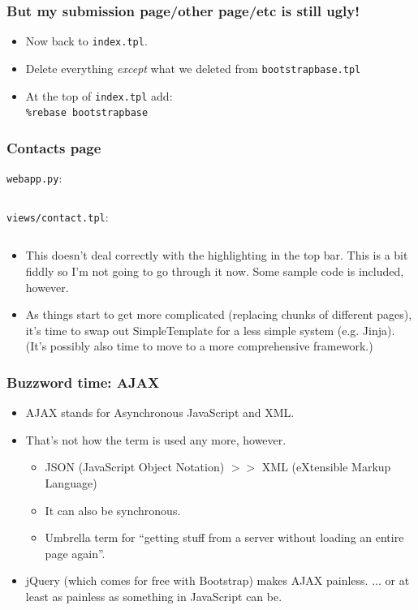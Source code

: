 \documentclass{beamer}
\begin{document}
\begin{frame}
  \frametitle{But my submission page/other page/etc is still ugly!}
  \begin{itemize}
  \item Now back to \texttt{index.tpl}.
  \item Delete everything \emph{except} what we deleted from
    \texttt{bootstrapbase.tpl}
  \item At the top of \texttt{index.tpl} add:\\
    \texttt{\%rebase bootstrapbase}
  \end{itemize}
\end{frame} 

\begin{frame}
  \frametitle{Contacts page}
  \texttt{webapp.py}:
  \inputminted[firstline=34,lastline=38]{python}{../steps/03-frontend/02-demo-app/webapp.py}
  \texttt{views/contact.tpl}:
  \inputminted{html}{../steps/03-frontend/02-demo-app/views/contact.tpl}
\end{frame}

\begin{frame}
  \begin{itemize}
  \item This doesn't deal correctly with the highlighting in the top
    bar. This is a bit fiddly so I'm not going to go through it
    now. Some sample code is included, however.
  \item As things start to get more complicated (replacing chunks of
    different pages), it's time to swap out SimpleTemplate for a less
    simple system (e.g. Jinja). (It's possibly also time to move to a
    more comprehensive framework.)
  \end{itemize}
\end{frame}

\begin{frame}
  \frametitle{Buzzword time: AJAX}
  \begin{itemize}
  \item AJAX stands for Asynchronous JavaScript and XML.
  \item That's not how the term is used any more, however.
    \begin{itemize}
    \item JSON (JavaScript Object Notation) $>>$ XML (eXtensible
      Markup Language)
    \item It can also be synchronous.
    \item Umbrella term for ``getting stuff from a server without
      loading an entire page again''.
    \end{itemize}
  \item jQuery (which comes for free with Bootstrap) makes AJAX
    painless. {\tiny ... or at least as painless as something in JavaScript can be.}
  \end{itemize}
\end{frame}
\end{document}
